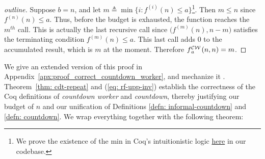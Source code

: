 \begin{proof}[outline]
	Suppose $b = n$, and let $m \triangleq \min\big\{i : f^{(i)}(n)\le a\big\}$\footnote{We prove the existence
		of the min in Coq’s intuitionistic logic \href{https://github.com/inv-ack/inv-ack/blob/6099297c6ab0e16d14b037fb5ed600c4d22818f6/countdown.v\#L125-L150}{here} in our codebase.}. Then $m \le n$ since $f^{(n)}(n)\le a$. Thus, before the budget is exhausted, the function reaches \linebreak the $m^{th}$ call. This is actually the last recursive call since $\big(f^{(m)}(n), n - m\big)$ satisfies the terminating condition $f^{(m)}(n)\le a$. This last call adds $0$ to the accumulated result, which is $m$ at the moment. Therefore $\cdw{f}{a}(n, n) = m$.
\end{proof}
We give an extended version of this proof in
Appendix~\ref{apx:proof_correct_countdown_worker},
and mechanize it .
Theorem~\ref{thm: cdt-repeat} and (\ref{eq: rf-upp-inv}) establish the correctness of the Coq definitions of \emph{countdown worker} and \emph{countdown}, thereby justifying our budget of $n$ and our unification of
Definitions \ref{defn: informal-countdown} and \ref{defn: countdown}. We wrap everything together with the following theorem:
